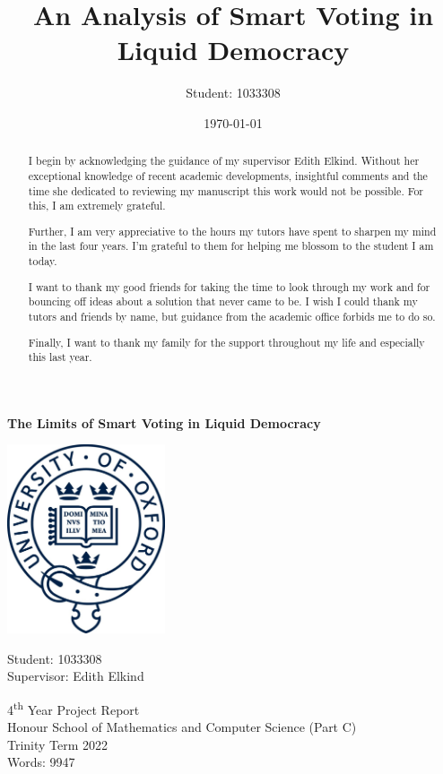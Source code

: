 \documentclass[11pt,a4paper, titlepage]{article}
\title{An Analysis of Smart Voting in Liquid Democracy}
\author{Student: 1033308}
\date{\today}
\theoremstyle{definition}
\begin{document}
\begin{titlepage}
    \begin{center}
        \huge
        \textbf{The Limits of Smart Voting in Liquid Democracy}

        \vfill
        
        \includegraphics[width=0.35\textwidth]{logo.jpeg}
        
        \vfill
        
        \LARGE
        Student: 1033308 \\
        \Large
        Supervisor: Edith Elkind\\
        
        \vspace*{1.5cm}
        
        4\textsuperscript{th} Year Project Report\\
        \vspace*{2pt}
        Honour School of Mathematics and Computer Science (Part C)\\
        \vspace*{.5cm}
        Trinity Term 2022 \\
        Words: 9947
    \end{center}

\end{titlepage}

\renewcommand{\abstractname}{Acknowledgements}
\begin{abstract}
    I begin by acknowledging the guidance of my supervisor Edith Elkind. Without her exceptional knowledge of recent academic developments, insightful comments and the time she dedicated to reviewing my manuscript this work would not be possible.
For this, I am extremely grateful.

Further, I am very appreciative to the hours my tutors have spent to sharpen my mind in the last four years. I'm grateful to them for helping me blossom to the student I am today.

I want to thank my good friends for taking the time to look through my work and for bouncing off ideas about a solution that never came to be.
I wish I could thank my tutors and friends by name, but guidance from the academic office forbids me to do so.

Finally, I want to thank my family for the support throughout my life and especially this last year.

\end{abstract}
\end{document}
